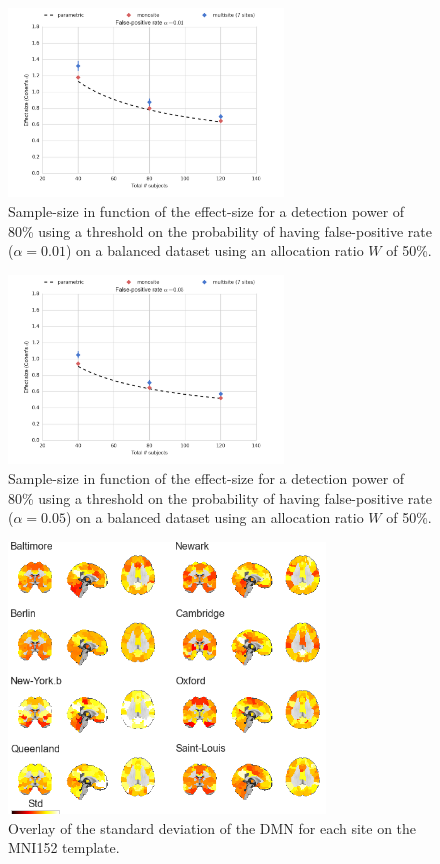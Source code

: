 \documentclass[authoryear]{elsarticle}
\begin{document}
\begin{figure}[tbp]
\centering
\includegraphics[width=0.65\textwidth]{../figures/samplesize_effectsize_pow80_alpha01.png}
\caption[]{
Sample-size in function of the effect-size for a detection power of 80\% using a threshold on the probability of having false-positive rate ($\alpha=0.01$) on a balanced dataset using an allocation ratio $W$ of 50\%.
}
\label{fig_sampeffect_curves_alpha01}
\end{figure}
\begin{figure}[tbp]
\centering
\includegraphics[width=0.65\textwidth]{../figures/samplesize_effectsize_pow80_alpha05.png}
\caption[]{
Sample-size in function of the effect-size for a detection power of 80\% using a threshold on the probability of having false-positive rate ($\alpha=0.05$) on a balanced dataset using an allocation ratio $W$ of 50\%.
}
\label{fig_sampeffect_curves_alpha05}
\end{figure}

\begin{figure}[tbp]
\centering
\includegraphics[width=0.75\textwidth]{../figures/dmn_stdmultisite.png}
\caption[]{
Overlay of the standard deviation of the DMN for each site on the MNI152 template.
}
\label{fig_std_DMNs}
\end{figure}
\end{document}
